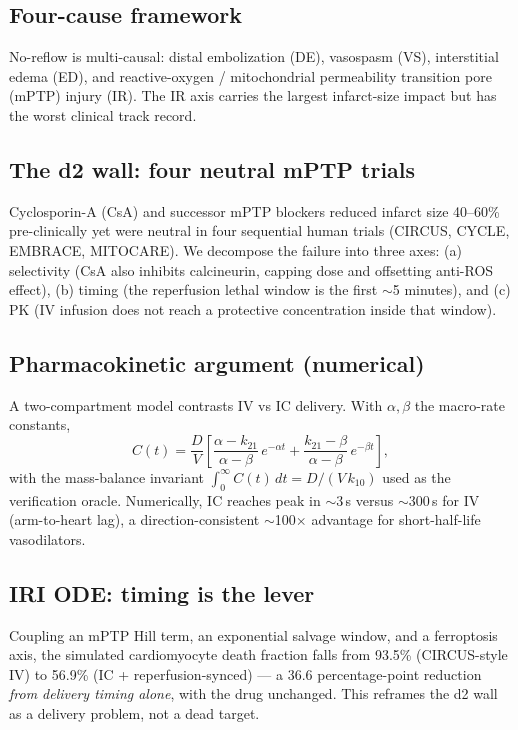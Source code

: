 \documentclass[11pt]{article}
\begin{document}
\subsection{Four-cause framework}
No-reflow is multi-causal: distal embolization (DE), vasospasm (VS), interstitial edema (ED), and reactive-oxygen / mitochondrial permeability transition pore (mPTP) injury (IR). The IR axis carries the largest infarct-size impact but has the worst clinical track record.

\subsection{The d2 wall: four neutral mPTP trials}
Cyclosporin-A (CsA) and successor mPTP blockers reduced infarct size 40--60\% pre-clinically yet were neutral in four sequential human trials (CIRCUS, CYCLE, EMBRACE, MITOCARE). We decompose the failure into three axes: (a) selectivity (CsA also inhibits calcineurin, capping dose and offsetting anti-ROS effect), (b) timing (the reperfusion lethal window is the first $\sim$5 minutes), and (c) PK (IV infusion does not reach a protective concentration inside that window).

\subsection{Pharmacokinetic argument (numerical)}
A two-compartment model contrasts IV vs IC delivery. With $\alpha,\beta$ the macro-rate constants,
\begin{equation}
C(t) = \frac{D}{V}\left[\frac{\alpha - k_{21}}{\alpha - \beta}\,e^{-\alpha t} + \frac{k_{21}-\beta}{\alpha-\beta}\,e^{-\beta t}\right],
\label{eq:pk2comp}
\end{equation}
with the mass-balance invariant $\int_0^\infty C(t)\,dt = D/(V\,k_{10})$ used as the verification oracle. Numerically, IC reaches peak in $\sim$3\,s versus $\sim$300\,s for IV (arm-to-heart lag), a direction-consistent $\sim$100$\times$ advantage for short-half-life vasodilators.

\subsection{IRI ODE: timing is the lever}
Coupling an mPTP Hill term, an exponential salvage window, and a ferroptosis axis, the simulated cardiomyocyte death fraction falls from 93.5\% (CIRCUS-style IV) to 56.9\% (IC + reperfusion-synced) --- a 36.6 percentage-point reduction \emph{from delivery timing alone}, with the drug unchanged. This reframes the d2 wall as a delivery problem, not a dead target.
\end{document}
